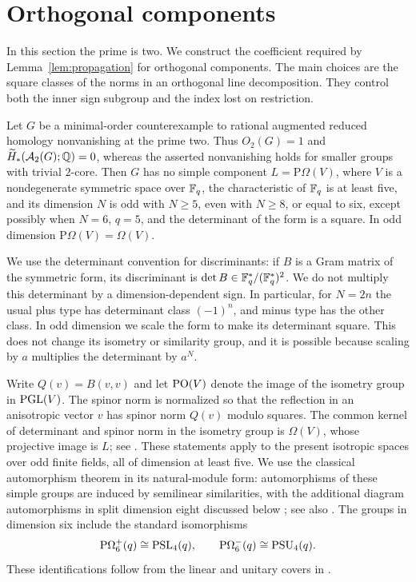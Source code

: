 \section{Orthogonal components}
\label{sec:orthogonal}

In this section the prime is two.  We construct the coefficient required by
Lemma~\ref{lem:propagation} for orthogonal components.  The main choices are
the square classes of the norms in an orthogonal line decomposition.  They
control both the inner sign subgroup and the index lost on restriction.

\begin{proposition}\label{prop:orthogonal}
Let $G$ be a minimal-order counterexample to rational augmented reduced
homology nonvanishing at the prime two.  Thus $O_2(G)=1$ and
$\widetilde H_*(\mathcal A_2(G);\mathbb Q)=0$, whereas the asserted nonvanishing
holds for smaller groups with trivial $2$-core.  Then $G$ has no simple
component $L=\mathrm P\Omega(V)$, where $V$ is a nondegenerate symmetric
space over $\mathbb F_q$, the characteristic of $\mathbb F_q$ is at least five, and
its dimension $N$ is odd with $N\ge5$, even with $N\ge8$, or equal to six,
except possibly when $N=6$, $q=5$, and the determinant of the form is a
square.  In odd dimension $\mathrm P\Omega(V)=\Omega(V)$.
\end{proposition}

We use the determinant convention for discriminants: if $B$ is a Gram
matrix of the symmetric form, its discriminant is
$\det B\in\mathbb F_q^*/(\mathbb F_q^*)^2$.  We do not multiply this determinant by a
dimension-dependent sign.  In particular, for $N=2n$ the usual plus type
has determinant class $(-1)^n$, and minus type has the other class.  In
odd dimension we scale the form to make its determinant square.  This
does not change its isometry or similarity group, and it is possible
because scaling by $a$ multiplies the determinant by $a^N$.

Write $Q(v)=B(v,v)$ and let $\operatorname{PO}(V)$ denote the image of the isometry
group in $\operatorname{PGL}(V)$.  The spinor norm is normalized so that the reflection
in an anisotropic vector $v$ has spinor norm $Q(v)$ modulo squares.
The common kernel of determinant and spinor norm in the isometry group
is $\Omega(V)$, whose projective image is $L$; see
\citet[Lemma~11.49 and Theorems~11.50--11.51]{Taylor1992}.
These statements apply to the present isotropic spaces over odd
finite fields, all of dimension at least five.  We use the classical
automorphism theorem in its natural-module form: automorphisms of these
simple groups are induced by semilinear similarities, with the additional
diagram automorphisms in split dimension eight discussed below
\citep[Section~2 and statements~3.2--3.6]{Steinberg1960}; see also
\citet{GLS1998}. The groups in dimension six include the standard
isomorphisms
\[
 \mathrm P\Omega_6^+(q)\cong\operatorname{PSL}_4(q),\qquad
 \mathrm P\Omega_6^-(q)\cong\operatorname{PSU}_4(q).
\]
These identifications follow from the linear and unitary covers in
\citet[Corollaries~12.21 and~12.36]{Taylor1992}.

